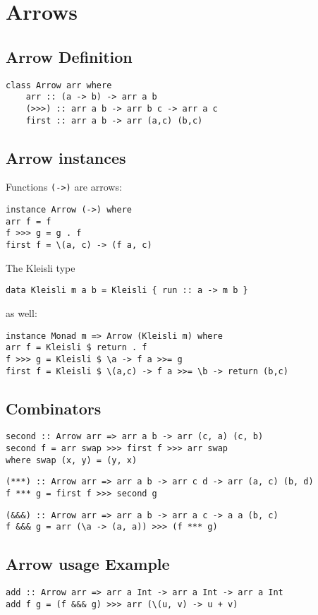 \section{Arrows}

\subsection{Arrow Definition}
\begin{lstlisting}[frame=htrbl]
class Arrow arr where
	arr :: (a -> b) -> arr a b
	(>>>) :: arr a b -> arr b c -> arr a c
	first :: arr a b -> arr (a,c) (b,c)
\end{lstlisting}

\frbreak

\subsection{Arrow instances}
Functions \lstinline{(->)} are arrows:
\begin{lstlisting}[frame=htrbl]
instance Arrow (->) where
arr f = f
f >>> g = g . f
first f = \(a, c) -> (f a, c) 
\end{lstlisting}
\frbreak
The Kleisli type
\begin{lstlisting}[frame=htrbl]
data Kleisli m a b = Kleisli { run :: a -> m b }
\end{lstlisting}
as well:
\begin{lstlisting}[frame=htrbl]
instance Monad m => Arrow (Kleisli m) where
arr f = Kleisli $ return . f
f >>> g = Kleisli $ \a -> f a >>= g
first f = Kleisli $ \(a,c) -> f a >>= \b -> return (b,c)
\end{lstlisting}

\frbreak
\subsection{Combinators}
\begin{lstlisting}[frame=htrbl]
second :: Arrow arr => arr a b -> arr (c, a) (c, b)
second f = arr swap >>> first f >>> arr swap
where swap (x, y) = (y, x)
\end{lstlisting}
\begin{lstlisting}[frame=htrbl]
(***) :: Arrow arr => arr a b -> arr c d -> arr (a, c) (b, d)
f *** g = first f >>> second g
\end{lstlisting}
\begin{lstlisting}[frame=htrbl]
(&&&) :: Arrow arr => arr a b -> arr a c -> a a (b, c)
f &&& g = arr (\a -> (a, a)) >>> (f *** g)
\end{lstlisting}
\frbreak

\subsection{Arrow usage Example}
\begin{lstlisting}[frame=htrbl]
add :: Arrow arr => arr a Int -> arr a Int -> arr a Int
add f g = (f &&& g) >>> arr (\(u, v) -> u + v)
\end{lstlisting}
\frbreak